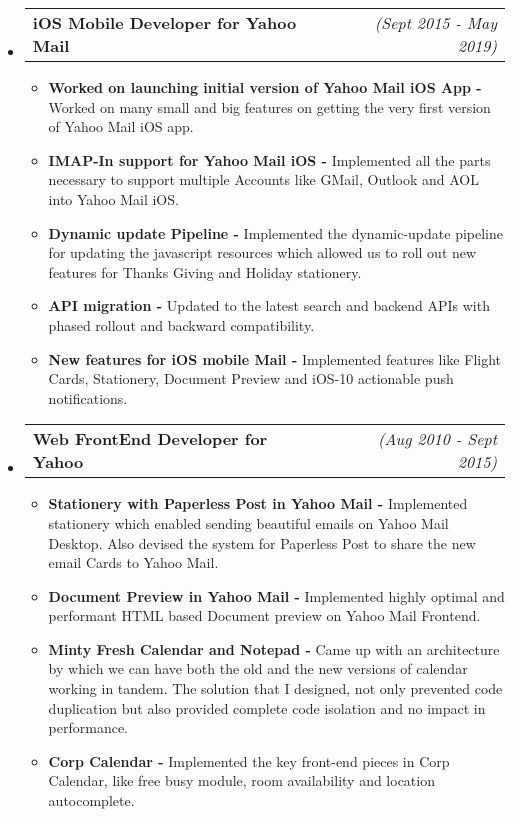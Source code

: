 \documentclass[a4paper,11pt,times]{res}
\makeatletter
\newcommand{\smalitem}[1]{\item #1 \vspace{-4pt}}
\newcommand{\mysubheading}[2]{
\begin{tabular*}{172mm}{l@{\extracolsep{\fill}}r}
		\textbf{#1} & \textit{#2} \\
\end{tabular*}\vspace{-1pt}}
\makeatother
\begin{document}
\begin{itemize}
\begin{itemize}
\end{itemize}

\vspace{2pt}

\item
\mysubheading{iOS Mobile Developer for Yahoo Mail }{(Sept 2015 - May 2019)}
\begin{itemize}
\vspace{-2pt}
\smalitem{\textbf{Worked on launching initial version of Yahoo Mail iOS App -} Worked on many small and big features on getting the very first version of Yahoo Mail iOS app.}
\smalitem{\textbf{IMAP-In support for Yahoo Mail iOS -} Implemented all the parts necessary to support multiple Accounts like GMail, Outlook and AOL into Yahoo Mail iOS.}
\smalitem{\textbf{Dynamic update Pipeline -} Implemented the dynamic-update pipeline for updating the javascript resources which allowed us to roll out new features for Thanks Giving and Holiday stationery.}
\smalitem{\textbf{API migration -} Updated to the latest search and backend APIs with phased rollout and backward compatibility.}
\smalitem{\textbf{New features for iOS mobile Mail -} Implemented features like Flight Cards, Stationery, Document Preview and iOS-10 actionable push notifications.}

\end{itemize}

\vspace{10pt}

\item
\mysubheading{Web FrontEnd Developer for Yahoo }{(Aug 2010 - Sept 2015)}
\begin{itemize}
\vspace{-2pt}
\smalitem{\textbf{Stationery with Paperless Post in Yahoo Mail -} Implemented stationery which enabled sending beautiful emails on Yahoo Mail Desktop. Also devised the system for Paperless Post to share the new email Cards to Yahoo Mail.}
\smalitem{\textbf{Document Preview in Yahoo Mail -} Implemented highly optimal and performant HTML based Document preview on Yahoo Mail Frontend.}
\smalitem{\textbf{Minty Fresh Calendar and Notepad -} Came up with an architecture by which we can have both the old and the new versions of calendar working in tandem. The solution that I designed, not only prevented code duplication but also provided complete code isolation and no impact in performance.}
\smalitem{\textbf{Corp Calendar -} Implemented the key front-end pieces in Corp Calendar, like free busy module, room availability and location autocomplete.}
\end{itemize}

\end{itemize}
\end{document}
